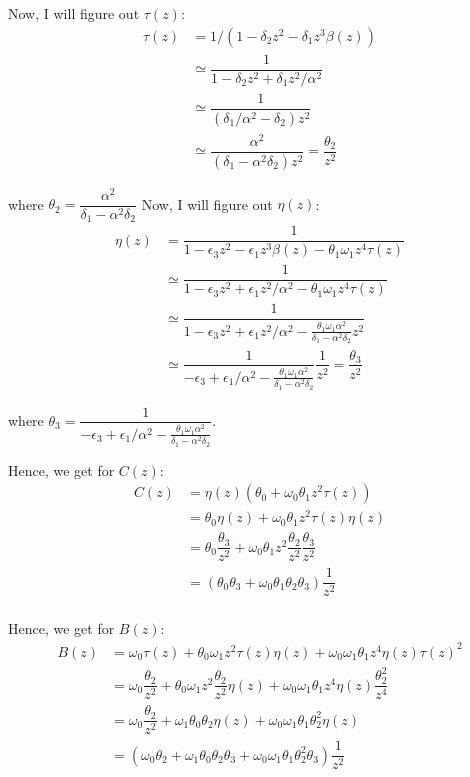 \documentclass[11pt,a4paper]{article}
\begin{document}
Now, I will figure out $\tau(z)$:
\begin{align*}
\tau(z) &= 1/ (1 - \delta_2 z^2 -\delta_1  z^3   \beta(z) )\\
& \simeq \dfrac{1}{1 - \delta_2 z^2 + \delta_1  z^2/ \alpha^2    }\\
& \simeq \dfrac{1}{(\delta_1/ \alpha^2 - \delta_2) z^2      }\\
&\simeq \dfrac{\alpha^2}{(\delta_1 -  \alpha^2 \delta_2) z^2      }= \dfrac{\theta_2 }{z^2}
\end{align*}

where $\theta_2=\dfrac{\alpha^2}{\delta_1 -  \alpha^2 \delta_2     }$
Now, I will figure out $\eta(z)$:
\begin{align*}
\eta(z)&=\dfrac{1}{1 - \epsilon_3 z^2 - \epsilon_1  z^3   \beta(z) -\theta_1   \omega_1  z^4 \tau(z)   }\\
& \simeq \dfrac{1}{1 - \epsilon_3 z^2 + \epsilon_1  z^2/ \alpha^2 -\theta_1   \omega_1 z^4 \tau(z)     }\\
& \simeq \dfrac{1}{1 - \epsilon_3 z^2 + \epsilon_1  z^2/ \alpha^2 - \frac{\theta_1   \omega_1 \alpha^2}{\delta_1 -  \alpha^2 \delta_2} z^2}\\
& \simeq \dfrac{1}{ - \epsilon_3  + \epsilon_1  / \alpha^2 - \frac{\theta_1   \omega_1 \alpha^2}{\delta_1 -  \alpha^2 \delta_2} } \dfrac{1}{z^2} = \dfrac{\theta_3 }{z^2}
\end{align*}

where $\theta_3=\dfrac{1}{ - \epsilon_3  + \epsilon_1  / \alpha^2 - \frac{\theta_1   \omega_1 \alpha^2}{\delta_1 -  \alpha^2 \delta_2} }$. 


Hence, we get for $C(z)$:
\begin{align*}
C(z)  &=  \eta(z) (\theta_0+  \omega_0 \theta_1  z^2  \tau(z) ) \\
&=  \theta_0 \eta(z) +  \omega_0 \theta_1  z^2  \tau(z)\eta(z) \\
&=  \theta_0 \dfrac{\theta_3 }{z^2} +  \omega_0 \theta_1  z^2  \dfrac{\theta_2 }{z^2} \dfrac{\theta_3 }{z^2} \\
&=  (\theta_0 \theta_3  +    \omega_0 \theta_1 \theta_2 \theta_3 ) \dfrac{1 }{z^2}  \\
\end{align*}


Hence, we get for $B(z)$:
\begin{align*}
B(z)  & =\omega_0 \tau(z) +   \theta_0 \omega_1 z^2  \tau(z) \eta(z)  + \omega_0 \omega_1  \theta_1    z^4 \eta(z)  \tau(z) ^2  \\
& =\omega_0 \dfrac{\theta_2 }{z^2} +   \theta_0 \omega_1 z^2  \dfrac{\theta_2 }{z^2} \eta(z)  + \omega_0 \omega_1  \theta_1    z^4 \eta(z) \dfrac{\theta_2^2 }{z^4} \\
& =\omega_0 \dfrac{\theta_2 }{z^2} +  \omega_1 \theta_0  \theta_2  \eta(z)  + \omega_0 \omega_1  \theta_1  \theta_2^2  \eta(z)  \\
& =(\omega_0 \theta_2 +  \omega_1 \theta_0  \theta_2   \theta_3  + \omega_0 \omega_1  \theta_1  \theta_2^2  \theta_3)\dfrac{ 1}{z^2}  
\end{align*}
\end{document}
